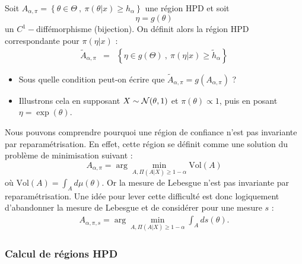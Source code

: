 \begin{exec}
Soit $A_{\alpha,\pi}=\left\{\theta\in\Theta  \ , \ \pi(\theta|x)\geq h_{\alpha}\right\}$ une région HPD et soit 
$$
\eta = g(\theta)
$$
un $C^1-$diffémorphisme (bijection). On définit alors la région HPD correspondante pour $\pi(\eta|x)$ :
\begin{eqnarray*}
\tilde{A}_{\alpha,\pi} & = & \left\{\eta\in g(\Theta)  \ , \ \pi(\eta|x)\geq \tilde{h}_{\alpha}\right\}
\end{eqnarray*}
\begin{itemize}
    \item Sous quelle condition peut-on écrire que $\tilde{A}_{\alpha,\pi}=g\left(A_{\alpha,\pi}\right)$ ?
    \item Illustrons cela en supposant $X\sim{\cal{N}}(\theta,1)$ et $\pi(\theta)\propto 1$, puis en posant $\eta=\exp(\theta)$.
\end{itemize}
\end{exec}

\if{} 
\fi

\vspace{1cm}

Nous pouvons comprendre pourquoi une région de confiance n’est pas invariante par reparamétrisation. En effet, cette région se définit comme une solution du problème de minimisation suivant :
$$
A_{\alpha,\pi} = \arg\min\limits_{A, \Pi(A|X)\geq 1-\alpha} \mbox{Vol}(A)
$$
où $\mbox{Vol}(A)=\int_A d\mu(\theta)$. Or la mesure de Lebesgue n’est 
pas invariante par reparamétrisation. Une idée pour lever cette difficulté est donc logiquement d’abandonner la mesure de Lebesgue et de considérer pour une mesure $s$ :
\begin{eqnarray*}
A_{\alpha,\pi,s} = \arg\min\limits_{A, \Pi(A|X)\geq 1-\alpha} \int_A d s(\theta).
\end{eqnarray*}

\subsubsection*{Calcul de régions HPD}

